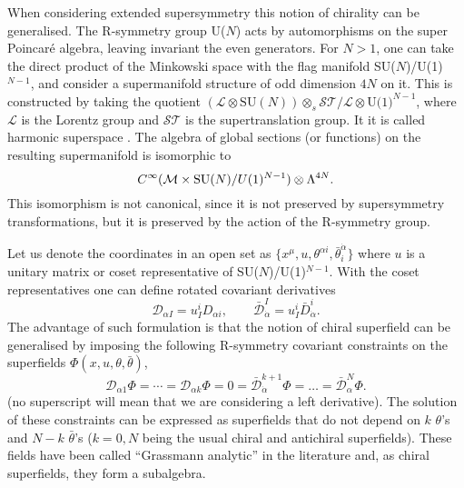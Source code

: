 \documentclass[a4paper,12pt]{article}
\begin{document}
When considering extended supersymmetry this notion of chirality can be 
generalised.  The R-symmetry group
  U($N$) acts   by automorphisms on the super 
Poincar\'e algebra, leaving invariant the even generators. For $N>1$,
one can take the direct product of the Minkowski space with the flag
manifold
SU($N$)/U(1)$^{N-1}$, and consider a  supermanifold structure of odd 
dimension 
$4N$ on it. This is constructed by taking the quotient 
$(\mathcal{L}\otimes\mbox{SU}(N))\otimes_s\mathcal{ST}/\mathcal{L}\otimes
\mbox{U(1)}^{N-1}$,
where $\mathcal{L}$ is the Lorentz group and $\mathcal{ST}$ is the
supertranslation group.
 It it is called harmonic superspace \cite{gikos}.
 The algebra of global sections (or functions) on the
resulting supermanifold is isomorphic to 
 \begin{equation}
C^\infty(\mathcal{M}\times
 \hbox{SU}(N)/U(1)^{N-1})\otimes \Lambda^{4N}.
\label{hs}
\end{equation}
This isomorphism is not canonical,
 since it is not preserved by supersymmetry transformations, but it is
preserved 
by the action of the R-symmetry group.  







Let us  denote the coordinates
 in an open set as $\{x^\mu, u,\theta^{\alpha i}, \bar\theta^{\dot\alpha
}_i\}$
 where $u$ is a unitary matrix or coset representative of
SU($N$)/U(1)$^{N-1}$. With the coset 
representatives one can define  rotated covariant derivatives
$$
\mathcal{D}_{\alpha I }=u_I^iD_{\alpha i}, \qquad 
\bar{\mathcal{D}}_{\dot\alpha}^I=u_I^i\bar{D}_{\dot\alpha}^i.
$$
 The advantage of such 
formulation is that the notion of chiral superfield can be generalised 
by imposing the following R-symmetry covariant  constraints on the
superfields $\Phi(x,u,\theta,
\bar\theta)$,
$$
\mathcal{D}_{\alpha 1}\Phi=\cdots=\mathcal{D}_{\alpha k}\Phi=0=
\bar{\mathcal{D}}_{\dot \alpha}^{k+1}\Phi=\dots=\bar{\mathcal{D}}_{\alpha
}^N\Phi.
$$
(no superscript will mean that we are considering a left derivative).
The solution of these constraints can be expressed as superfields that do
 not depend on  $k$ $\theta$'s and
 $N-k$ $\bar\theta$'s  ($k=0,N$ being the usual chiral and antichiral 
superfields). These fields have been called   
``Grassmann analytic'' in the literature \cite{fs} and, as chiral 
superfields, they form a subalgebra.
\end{document}
